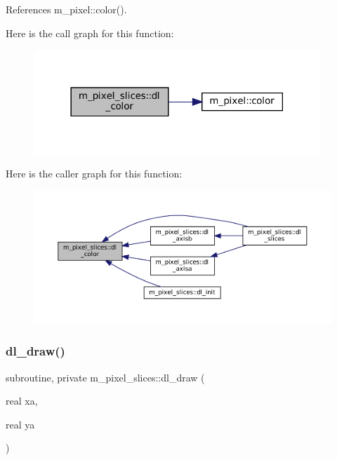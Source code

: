 References m\+\_\+pixel\+::color().

Here is the call graph for this function\+:\nopagebreak
\begin{figure}[H]
\begin{center}
\leavevmode
\includegraphics[width=306pt]{namespacem__pixel__slices_a8e362bf8eea80faddc97f7d137c95f9c_cgraph}
\end{center}
\end{figure}
Here is the caller graph for this function\+:\nopagebreak
\begin{figure}[H]
\begin{center}
\leavevmode
\includegraphics[width=350pt]{namespacem__pixel__slices_a8e362bf8eea80faddc97f7d137c95f9c_icgraph}
\end{center}
\end{figure}
\mbox{\label{namespacem__pixel__slices_acafdf0174290a0e231ca120f6305b5d0}} 
\subsubsection{\texorpdfstring{dl\+\_\+draw()}{dl\_draw()}}
{\footnotesize\ttfamily subroutine, private m\+\_\+pixel\+\_\+slices\+::dl\+\_\+draw (\begin{DoxyParamCaption}\item[{real}]{xa,  }\item[{real}]{ya }\end{DoxyParamCaption})\hspace{0.3cm}{\ttfamily [private]}}



